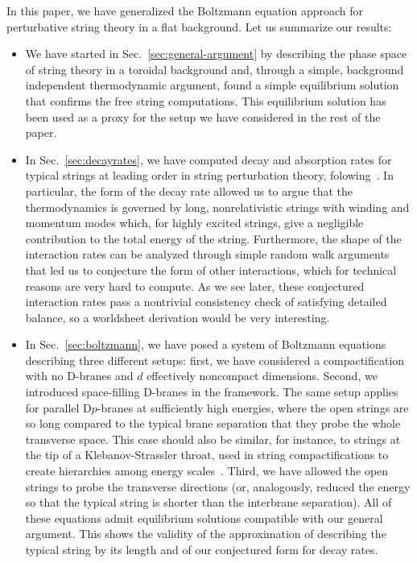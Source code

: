 \documentclass[a4paper,11pt]{article}
\begin{document}
{{{{{{{{{{{{In this paper, we have generalized the Boltzmann equation approach for perturbative string theory in a flat background.
Let us summarize our results:
\begin{itemize}
    \item We have started in Sec.~\ref{sec:general-argument} by describing the phase space of string theory in a toroidal background and, through a simple, background independent thermodynamic argument, found a simple equilibrium solution that confirms the free string computations.
    This equilibrium solution has been used as a proxy for the setup we have considered in the rest of the paper.
    \item In Sec.~\ref{sec:decayrates}, we have computed decay and absorption rates for typical strings at leading order in string perturbation theory, folowing~\cite{Manes:2001cs}.
    In particular, the form of the decay rate allowed us to argue that the thermodynamics is governed by long, nonrelativistic strings with winding and momentum modes which, for highly excited strings, give a negligible contribution to the total energy of the string.
    Furthermore, the shape of the interaction rates can be analyzed through simple random walk arguments that led us to conjecture the form of other interactions, which for technical reasons are very hard to compute. As we see later, these conjectured interaction rates pass a nontrivial consistency check of satisfying detailed balance, so a worldsheet derivation would be very interesting.
\item  In Sec.~\ref{sec:boltzmann}, we have posed a system of        Boltzmann equations describing three different setups: first, we have considered a compactification with no D-branes and $d$ effectively noncompact dimensions.
    Second, we introduced space-filling D-branes in the framework. The same setup applies for parallel D$p$-branes at sufficiently high energies, where the open strings are so long compared to the typical brane separation that they probe the whole transverse space. This case should also be similar, for instance, to strings at the tip of a Klebanov-Strassler throat, used in string compactifications to create hierarchies among energy scales~\cite{Klebanov:2000hb,Giddings:2001yu}.
    Third, we have allowed the open strings to probe the transverse directions (or, analogously, reduced the energy so that the typical string is shorter than the interbrane separation).
    All of these equations admit equilibrium solutions compatible with our general argument. 
    This shows the validity of the approximation of describing the typical string by its length and of our conjectured form for decay rates.

\end{itemize}}}}}}}}}}}}}
\end{document}
